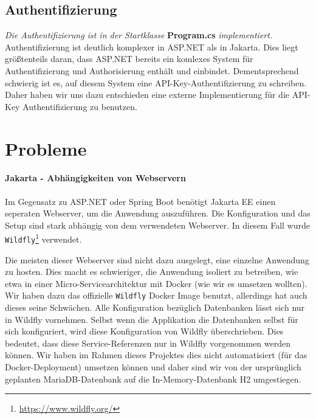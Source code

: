 \subsection{Authentifizierung}

\textit{Die Authentifizierung ist in der Startklasse} \textbf{Program.cs} \textit{implementiert.}\\

Authentifizierung ist deutlich komplexer in ASP.NET als in Jakarta. Dies liegt größtenteils daran,
dass ASP.NET bereits ein komlexes System für Authentifizierung und Authorisierung enthält und einbindet. 
Dementsprechend schwierig ist es, auf diesem System eine API-Key-Authentifizierung zu schreiben. 
Daher haben wir uns dazu entschieden eine externe Implementierung für die API-Key Authentifizierung zu benutzen.

\section{Probleme}

\paragraph{Jakarta - Abhängigkeiten von Webservern}

Im Gegensatz zu ASP.NET oder Spring Boot benötigt Jakarta EE einen seperaten Webserver, um die Anwendung auszuführen. 
Die Konfiguration und das Setup sind stark abhängig von dem verwendeten Webserver. 
In diesem Fall wurde \texttt{Wildfly}\footnote{\url{https://www.wildfly.org/}} verwendet.

Die meisten dieser Webserver sind nicht dazu ausgelegt, eine einzelne Anwendung zu hosten.
Dies macht es schwieriger, die Anwendung isoliert zu betreiben, 
wie etwa in einer Micro-Servicearchitektur mit Docker (wie wir es umsetzen wollten).
Wir haben dazu das offizielle \texttt{Wildfly} Docker Image benutzt,
 allerdings hat auch dieses seine Schwächen.
Alle Konfiguration bezüglich Datenbanken lässt sich nur in Wildfly vornehmen.
Selbst wenn die Applikation die Datenbanken selbst für sich konfiguriert, wird diese Konfiguration von Wildfly überschrieben.
Dies bedeutet, dass diese Service-Referenzen nur in Wildfly vorgenommen werden können.
Wir haben im Rahmen dieses Projektes dies nicht automatisiert (für das Docker-Deployment) umsetzen können
und daher sind wir von der ursprünglich geplanten MariaDB-Datenbank auf die In-Memory-Datenbank H2 umgestiegen.
